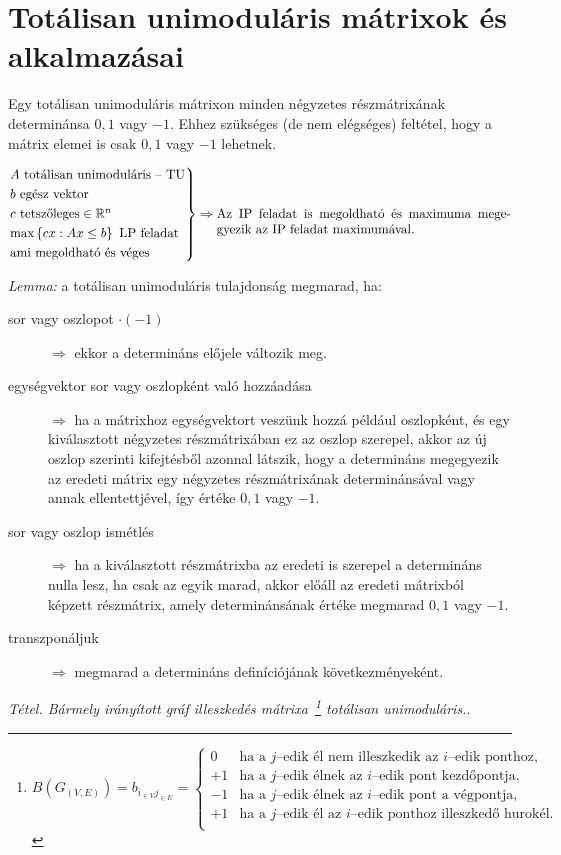 \newpage
\section{Totálisan unimoduláris mátrixok és alkalmazásai}

Egy totálisan unimoduláris mátrixon minden négyzetes részmátrixának determinánsa
$0, 1$ vagy $-1$. Ehhez szükséges (de nem elégséges) feltétel, hogy a mátrix
elemei is csak $0, 1$ vagy $-1$ lehetnek.

\[
\begin{rcases}
A \text{ totálisan unimoduláris -- TU} \\
b \text{ egész vektor} \\
c \text{ tetszőleges} \in \mathbb{R}^n \\
\text{max} \left\{ cx:Ax \leq b \right\} \text{ LP feladat}\\
\text{ami megoldható és véges}
\end{rcases} \Rightarrow \parbox[t]{8cm}{ Az IP feladat is megoldható és
maximuma megegyezik az IP feladat maximumával.}
\]

\emph{Lemma:} a totálisan unimoduláris tulajdonság megmarad, ha:

\begin{description}
  \item[sor vagy oszlopot $\cdot (-1)$] $\Rightarrow$ ekkor a determináns
  előjele változik meg.
  \item[egységvektor sor vagy oszlopként való hozzáadása] $\Rightarrow$ ha a
  mátrixhoz egységvektort veszünk hozzá például oszlopként, és egy kiválasztott
  négyzetes részmátrixában ez az oszlop szerepel, akkor az új oszlop szerinti
  kifejtésből azonnal látszik, hogy a determináns megegyezik az eredeti mátrix
  egy négyzetes részmátrixának determinánsával vagy annak ellentettjével, így
  értéke $0, 1$ vagy $-1$.
  \item[sor vagy oszlop ismétlés] $\Rightarrow$ ha a kiválasztott részmátrixba
  az eredeti is szerepel a determináns nulla lesz, ha csak az egyik marad, akkor
  előáll az eredeti mátrixból képzett részmátrix, amely determinánsának értéke
  megmarad $0, 1$ vagy $-1$. 
  \item[transzponáljuk] $\Rightarrow$ megmarad a determináns definíciójának
  következményeként.
\end{description}

\emph{Tétel. Bármely irányított gráf illeszkedés mátrixa~\footnote{$ 
B(G_{(V,E)})=
b_{i_{\in V}j_{\in E}}=
\begin{cases}
0  & \text{ha a } j \text{--edik él nem illeszkedik az } i \text{--edik ponthoz,} \\
+1  & \text{ha a } j \text{--edik élnek az } i \text{--edik pont kezdőpontja,} \\
-1  & \text{ha a } j \text{--edik élnek az } i \text{--edik pont a végpontja,} \\
+1  & \text{ha a } j \text{--edik él az } i \text{--edik ponthoz illeszkedő hurokél.} \\
\end{cases}$} totálisan unimoduláris.}.
\vspace{0.4cm}

